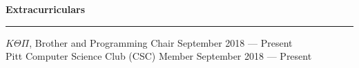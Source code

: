 \documentclass[11pt]{article}
\begin{document}
\begin{flushleft}
		\vspace{1.5mm}
		{\large \raggedright \textbf{Extracurriculars}}
		\vspace{1.25mm}
	
		\hrule
	
		\vspace{2.25mm}
		$K\Theta\Pi$, Brother and Programming Chair \hfill September 2018 --- Present\\
		Pitt Computer Science Club (CSC) Member \hfill September 2018 --- Present
	\end{flushleft}
\end{document}
